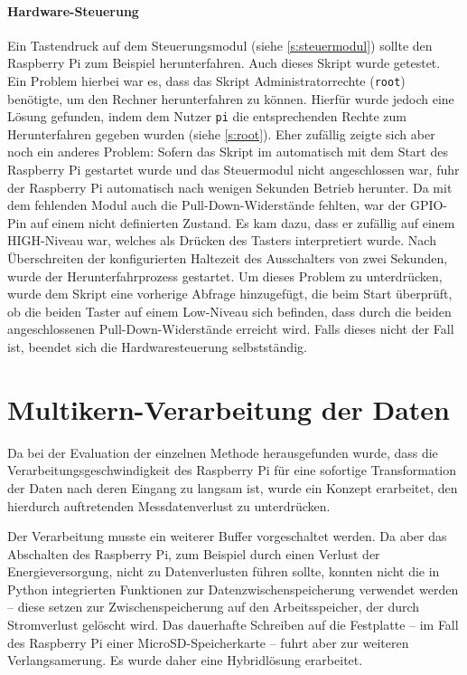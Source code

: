 \documentclass[a4paper,12pt,bibliography=totoc, listof=totoc,titlepage,pointlessnumbers]{scrreprt}
\newcommand{\code}[1]{\texttt{#1}}
\begin{document}
\paragraph{Hardware-Steuerung}
Ein Tastendruck auf dem Steuerungsmodul (siehe \autoref{s:steuermodul}) sollte den Raspberry Pi zum Beispiel herunterfahren. Auch dieses Skript wurde getestet. Ein Problem hierbei war es, dass das Skript Administratorrechte (\code{root}) benötigte, um den Rechner herunterfahren zu können. Hierfür wurde jedoch eine Lösung gefunden, indem dem Nutzer \code{pi} die entsprechenden Rechte zum Herunterfahren gegeben wurden (siehe \autoref{s:root}). Eher zufällig zeigte sich aber noch ein anderes Problem: Sofern das Skript im automatisch mit dem Start des Raspberry Pi gestartet wurde und das Steuermodul nicht angeschlossen war, fuhr der Raspberry Pi automatisch nach wenigen Sekunden Betrieb herunter. Da mit dem fehlenden Modul auch die Pull-Down-Widerstände fehlten, war der GPIO-Pin auf einem nicht definierten Zustand. Es kam dazu, dass er zufällig auf einem HIGH-Niveau war, welches als Drücken des Tasters interpretiert wurde. Nach Überschreiten der konfigurierten Haltezeit des Ausschalters von zwei Sekunden, wurde der Herunterfahrprozess gestartet. Um dieses Problem zu unterdrücken, wurde dem Skript eine vorherige Abfrage hinzugefügt, die beim Start überprüft, ob die beiden Taster auf einem Low-Niveau sich befinden, dass durch die beiden angeschlossenen Pull-Down-Widerstände erreicht wird. Falls dieses nicht der Fall ist, beendet sich die Hardwaresteuerung selbstständig.

\section{Multikern-Verarbeitung der Daten}
\label{s:multikern}
Da bei der Evaluation der einzelnen Methode herausgefunden wurde, dass die Verarbeitungsgeschwindigkeit des Raspberry Pi für eine sofortige Transformation der Daten nach deren Eingang zu langsam ist, wurde ein Konzept erarbeitet, den hierdurch auftretenden Messdatenverlust zu unterdrücken.

Der Verarbeitung musste ein weiterer Buffer vorgeschaltet werden. Da aber das Abschalten des Raspberry Pi, zum Beispiel durch einen Verlust der Energieversorgung, nicht zu Datenverlusten führen sollte, konnten nicht die in Python integrierten Funktionen zur Datenzwischenspeicherung verwendet werden -- diese setzen zur Zwischenspeicherung auf den Arbeitsspeicher, der durch Stromverlust gelöscht wird. Das dauerhafte Schreiben auf die Festplatte -- im Fall des Raspberry Pi einer MicroSD-Speicherkarte -- fuhrt aber zur weiteren Verlangsamerung. Es wurde daher eine Hybridlösung erarbeitet.
\end{document}

